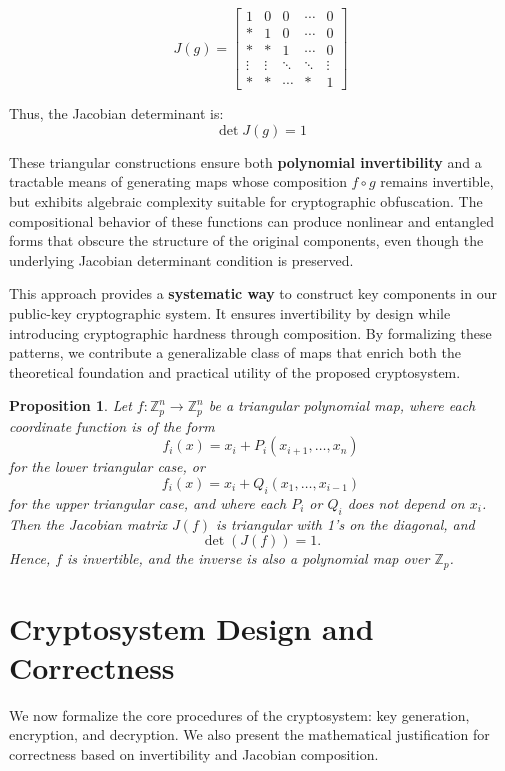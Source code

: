 \documentclass[12pt]{article}
\newtheorem{proposition}{Proposition}
\begin{document}
\[
J(g) =
\begin{bmatrix}
1 & 0 & 0 & \cdots & 0 \\
* & 1 & 0 & \cdots & 0 \\
* & * & 1 & \cdots & 0 \\
\vdots & \vdots & \ddots & \ddots & \vdots \\
* & * & \cdots & * & 1
\end{bmatrix}
\]

Thus, the Jacobian determinant is:
\[
\det J(g) = 1
\]

These triangular constructions ensure both \textbf{polynomial invertibility} and a tractable means of generating maps whose composition \( f \circ g \) remains invertible, but exhibits algebraic complexity suitable for cryptographic obfuscation. The compositional behavior of these functions can produce nonlinear and entangled forms that obscure the structure of the original components, even though the underlying Jacobian determinant condition is preserved.

This approach provides a \textbf{systematic way} to construct key components in our public-key cryptographic system. It ensures invertibility by design while introducing cryptographic hardness through composition. By formalizing these patterns, we contribute a generalizable class of maps that enrich both the theoretical foundation and practical utility of the proposed cryptosystem.

\begin{proposition}
Let \( f: \mathbb{Z}_p^n \to \mathbb{Z}_p^n \) be a triangular polynomial map, where each coordinate function is of the form
\[
f_i(x) = x_i + P_i(x_{i+1}, \dots, x_n)
\]
for the lower triangular case, or
\[
f_i(x) = x_i + Q_i(x_1, \dots, x_{i-1})
\]
for the upper triangular case, and where each \( P_i \) or \( Q_i \) does not depend on \( x_i \). Then the Jacobian matrix \( J(f) \) is triangular with 1’s on the diagonal, and
\[
\det(J(f)) = 1.
\]
Hence, \( f \) is invertible, and the inverse is also a polynomial map over \( \mathbb{Z}_p \).
\end{proposition}


\section{Cryptosystem Design and Correctness}

We now formalize the core procedures of the cryptosystem: key generation, encryption, and decryption. We also present the mathematical justification for correctness based on invertibility and Jacobian composition.
\end{document}
